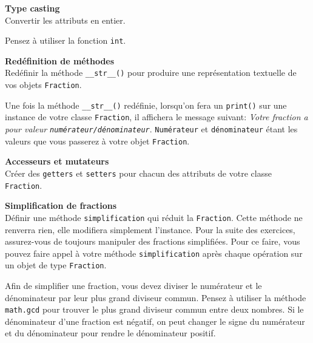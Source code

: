 \begin{Exercice}[5 minutes] \textbf{Type casting}\\
	Convertir les attributs en entier.
	\begin{conseil}
		Pensez à utiliser la fonction \lstinline{int}.
	\end{conseil}
\end{Exercice}

\begin{Exercice}[5 minutes] \textbf{Redéfinition de méthodes} \\
	Redéfinir la méthode \lstinline{__str__()} pour produire une représentation textuelle de vos objets \lstinline{Fraction}.
	\begin{conseil}
		Une fois la méthode \lstinline{__str__()} redéfinie, lorsqu'on fera un \lstinline{print()} sur une instance de votre classe \lstinline{Fraction}, il affichera le message suivant: \textit{Votre fraction a pour valeur \lstinline{numérateur/dénominateur}}. \lstinline{Numérateur} et \lstinline{dénominateur} étant les valeurs que vous passerez à votre objet \lstinline{Fraction}.
	\end{conseil}
\end{Exercice}

\begin{Exercice} [5 minutes] \textbf{Accesseurs et mutateurs} \\
	Créer des \lstinline{getters} et \lstinline{setters} pour chacun des attributs de votre classe \lstinline{Fraction}.
\end{Exercice}

\begin{Exercice} [10 minutes] \textbf{Simplification de fractions}\\
	Définir une méthode \lstinline{simplification} qui réduit la \lstinline{Fraction}. Cette méthode ne renverra rien, elle modifiera simplement l'instance. Pour la suite des exercices, assurez-vous de toujours manipuler des fractions simplifiées. Pour ce faire, vous pouvez faire appel à votre méthode \lstinline{simplification} après chaque opération sur un objet de type \lstinline{Fraction}.

	\begin{conseil}
		Afin de simplifier une fraction, vous devez diviser le numérateur et le dénominateur par leur plus grand diviseur commun. Pensez à utiliser la méthode \lstinline{math.gcd} pour trouver le plus grand diviseur commun entre deux nombres. Si le dénominateur d’une fraction est négatif, on peut changer le signe du numérateur et du dénominateur pour rendre le dénominateur positif.
	\end{conseil}
\end{Exercice}

